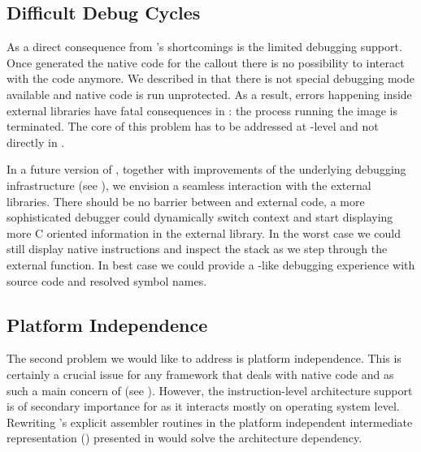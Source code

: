 \subsection{Difficult Debug Cycles}
As a direct consequence from \B's shortcomings is the limited debugging support.
Once \NB generated the native code for the callout there is no possibility to interact with the code anymore.
We \B described in  that there is not special debugging mode available and native code is run unprotected.
As a result, errors happening inside external libraries have fatal consequences in \NB: the process running the \PH image is terminated.
The core of this problem has to be addressed at \B-level and not directly in \NB.

In a future version of \NB, together with improvements of the underlying \B debugging infrastructure (see ), we envision a seamless interaction with the external libraries.
There should be no barrier between \PH and external code, a more sophisticated debugger could dynamically switch context and start displaying more C oriented information in the external library.
In the worst case we could still display native instructions and inspect the stack as we step through the external function.
In best case we could provide a \GDB-like debugging experience with source code and resolved symbol names.

\subsection{Platform Independence}
The second problem we would like to address is platform independence.
This is certainly a crucial issue for any framework that deals with native code and as such a main concern of \B (see ).
However, the instruction-level architecture support is of secondary importance for \NB as it interacts mostly on operating system level.
Rewriting \NB's explicit assembler routines in the platform independent intermediate representation (\VCPU) presented in  would solve the \CPU architecture dependency.

